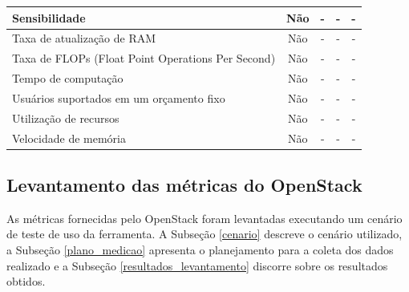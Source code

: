 \documentclass[conference]{IEEEtran}
\begin{document}
\begin{table}[]
\begin{tabular}{|l|c|c|c|c|}
Sensibilidade                                                  & \cellcolor[HTML]{EA9999}Não & \cellcolor[HTML]{EA9999}-                          & \cellcolor[HTML]{EA9999}-                          & \cellcolor[HTML]{EA9999}-                        \\ \hline
Taxa de atualização de RAM                                     & \cellcolor[HTML]{EA9999}Não & \cellcolor[HTML]{EA9999}-                          & \cellcolor[HTML]{EA9999}-                          & \cellcolor[HTML]{EA9999}-                        \\ \hline
Taxa de FLOPs (Float Point Operations Per Second)              & \cellcolor[HTML]{EA9999}Não & \cellcolor[HTML]{EA9999}-                          & \cellcolor[HTML]{EA9999}-                          & \cellcolor[HTML]{EA9999}-                        \\ \hline
Tempo de computação                                            & \cellcolor[HTML]{EA9999}Não & \cellcolor[HTML]{EA9999}-                          & \cellcolor[HTML]{EA9999}-                          & \cellcolor[HTML]{EA9999}-                        \\ \hline
Usuários suportados em um orçamento fixo                       & \cellcolor[HTML]{EA9999}Não & \cellcolor[HTML]{EA9999}-                          & \cellcolor[HTML]{EA9999}-                          & \cellcolor[HTML]{EA9999}-                        \\ \hline
Utilização de recursos                                         & \cellcolor[HTML]{EA9999}Não & \cellcolor[HTML]{EA9999}-                          & \cellcolor[HTML]{EA9999}-                          & \cellcolor[HTML]{EA9999}-                        \\ \hline
Velocidade de memória                                          & \cellcolor[HTML]{EA9999}Não & \cellcolor[HTML]{EA9999}-                          & \cellcolor[HTML]{EA9999}-                          & \cellcolor[HTML]{EA9999}-                        \\ \hline
\end{tabular}
\end{table}
  
  \subsection{Levantamento das métricas do OpenStack}
  
    As métricas fornecidas pelo OpenStack foram levantadas executando um cenário de teste de uso da ferramenta. 
    A Subseção \ref{cenario} descreve o cenário utilizado, a Subseção \ref{plano_medicao} apresenta o planejamento para a
    coleta dos dados realizado e a Subseção \ref{resultados_levantamento} discorre sobre os resultados obtidos.
  
\end{document}
